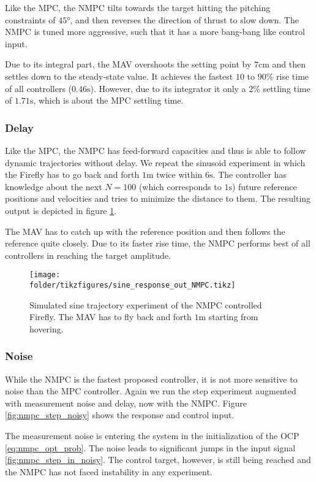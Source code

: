 Like the MPC, the NMPC tilts towards the target hitting the pitching constraints of $45\si{\degree}$, and then reverses the direction of thrust to slow down. The NMPC is tuned more aggressive, such that it has a more bang-bang like control input. 

Due to its integral part, the MAV overshoots the setting point by $7\si{\centi\metre}$ and then settles down to the steady-state value. It achieves the fastest $10$ to $90\si{\percent}$ rise time of all controllers ($0.46 \si{\second}$). However, due to its integrator it only a $2\si{\percent}$ settling time of $1.71 \si{\second}$, which is about the MPC settling time.

\subsubsection{Delay}
Like the MPC, the NMPC has feed-forward capacities and thus is able to follow dynamic trajectories without delay. We repeat the sinusoid experiment in which the Firefly has to go back and forth $1\si{\metre}$ twice within $6 \si{\second}$. The controller has knowledge about the next $N=100$ (which corresponds to $1\si{\second}$) future reference positions and velocities and tries to minimize the distance to them. The resulting output is depicted in figure \ref{fig:nmpc_sine}.

The MAV has to catch up with the reference position and then follows the reference quite closely. Due to its faster rise time, the NMPC performs best of all controllers in reaching the target amplitude.

\begin{figure}
\centering
\texttt{[image: \\folder/tikzfigures/sine\_response\_out\_NMPC.tikz]}
\caption{Simulated sine trajectory experiment  of the NMPC controlled Firefly. The MAV has to fly back and forth $1\si{\metre}$ starting from hovering.}
\label{fig:nmpc_sine}
\end{figure} 

\subsubsection{Noise}
While the NMPC is the fastest proposed controller, it is not more sensitive to noise than the MPC controller. Again we run the step experiment augmented with measurement noise and delay, now with the NMPC. Figure \ref{fig:nmpc_step_noisy} shows the response and control input. 

The measurement noise is entering the system in the initialization of the OCP \ref{eq:nmpc_opt_prob}. The noise leads to significant jumps in the input signal \ref{fig:nmpc_step_in_noisy}. The control target, however, is still being reached and the NMPC has not faced instability in any experiment.

